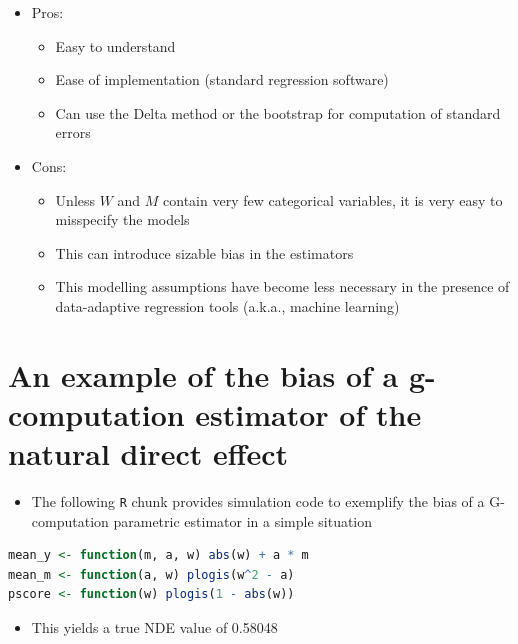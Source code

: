 \documentclass[
  12pt,
]{book}
\newcommand{\passthrough}[1]{#1}
\providecommand{\tightlist}{%
  \setlength{\itemsep}{0pt}\setlength{\parskip}{0pt}}
\theoremstyle{definition}
\theoremstyle{definition}
\theoremstyle{definition}
\newcommand{\1}{\mathbbm{1}}
\begin{document}
\begin{itemize}
\tightlist
\item
  Pros:

  \begin{itemize}
  \tightlist
  \item
    Easy to understand
  \item
    Ease of implementation (standard regression software)
  \item
    Can use the Delta method or the bootstrap for computation of standard errors
  \end{itemize}
\item
  Cons:

  \begin{itemize}
  \tightlist
  \item
    Unless \(W\) and \(M\) contain very few categorical variables, it is very easy
    to misspecify the models
  \item
    This can introduce sizable bias in the estimators
  \item
    This modelling assumptions have become less necessary in the presence of
    data-adaptive regression tools (a.k.a., machine learning)
  \end{itemize}
\end{itemize}

\hypertarget{an-example-of-the-bias-of-a-g-computation-estimator-of-the-natural-direct-effect}{%
\section{An example of the bias of a g-computation estimator of the natural direct effect}\label{an-example-of-the-bias-of-a-g-computation-estimator-of-the-natural-direct-effect}}

\begin{itemize}
\tightlist
\item
  The following \passthrough{\lstinline!R!} chunk provides simulation code to exemplify the bias of a
  G-computation parametric estimator in a simple situation
\end{itemize}

\begin{lstlisting}[language=R]
mean_y <- function(m, a, w) abs(w) + a * m
mean_m <- function(a, w) plogis(w^2 - a)
pscore <- function(w) plogis(1 - abs(w))
\end{lstlisting}

\begin{itemize}
\tightlist
\item
  This yields a true NDE value of 0.58048
\end{itemize}
\end{document}
